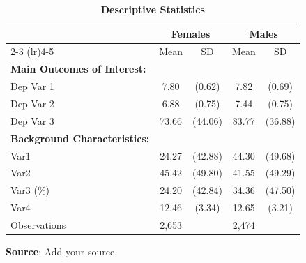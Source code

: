\begin{appendices}

\setlength{\tabcolsep}{3pt}
\renewcommand{\arraystretch}{0.8} %
\begin{table}[H]
\setcounter{table}{1}
\centering
\captionsetup{justification = raggedright, singlelinecheck = false, skip = 2pt}
\caption{\textbf{Descriptive Statistics}}
\label{tab:appendix-A1}
\begin{tabular}{lcccc}
\toprule
 & \multicolumn{2}{c}{Females} & \multicolumn{2}{c}{Males} \\
\cmidrule(lr){2-3} \cmidrule(lr){4-5}
 & Mean & SD & Mean & SD \\
\midrule
\textbf{Main Outcomes of Interest:} \\
Dep Var 1 & 7.80 & (0.62) & 7.82 & (0.69) \\
Dep Var 2 & 6.88 & (0.75) & 7.44 & (0.75) \\
Dep Var 3 & 73.66 & (44.06) & 83.77 & (36.88) \\
\textbf{Background Characteristics:} \\
Var1 & 24.27 & (42.88) & 44.30 & (49.68) \\
Var2 & 45.42 & (49.80) & 41.55 & (49.29) \\
Var3 (\%) & 24.20 & (42.84) & 34.36 & (47.50) \\
Var4 & 12.46 & (3.34) & 12.65 & (3.21) \\
\midrule
Observations & 2,653 &  & 2,474 &  \\
\bottomrule
\end{tabular}
\parbox{\textwidth}{\raggedright
\vspace{0.5em}
\textbf{Source}: Add your source.
}
\end{table}
\newpage















\end{appendices}
